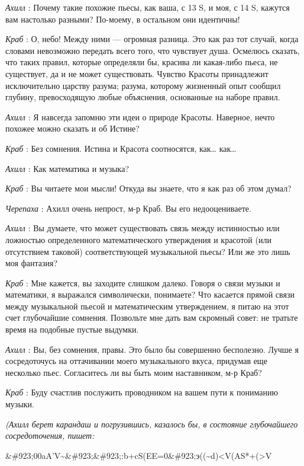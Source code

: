 \emph{Ахилл} : Почему такие похожие пьесы, как ваша, с 13 S, и моя, с 14 S, кажутся вам настолько разными? По-моему, в остальном они идентичны!

\emph{Краб} : О, небо! Между ними --- огромная разница. Это как раз тот случай, когда словами невозможно передать всего того, что чувствует душа. Осмелюсь сказать, что таких правил, которые определяли бы, красива ли какая-либо пьеса, не существует, да и не может существовать. Чувство Красоты принадлежит исключительно царству разума; разума, которому жизненный опыт сообщил глубину, превосходящую любые объяснения, основанные на наборе правил.

\emph{Ахилл} : Я навсегда запомню эти идеи о природе Красоты. Наверное, нечто похожее можно сказать и об Истине?

\emph{Краб} : Без сомнения. Истина и Красота соотносятся, как\ldots{} как\ldots{}

\emph{Ахилл} : Как математика и музыка?

\emph{Краб} : Вы читаете мои мысли! Откуда вы знаете, что я как раз об этом думал?

\emph{Черепаха} : Ахилл очень непрост, м-р Краб. Вы его недооцениваете.

\emph{Ахилл} : Вы думаете, что может существовать связь между истинностью или ложностью определенного математического утверждения и красотой (или отсутствием таковой) соответствующей музыкальной пьесы? Или же это лишь моя фантазия?

\emph{Краб} : Мне кажется, вы заходите слишком далеко. Говоря о связи музыки и математики, я выражался символически, понимаете? Что касается прямой связи между музыкальной пьесой и математическим утверждением, я питаю на этот счет глубочайшие сомнения. Позвольте мне дать вам скромный совет: не тратьте время на подобные пустые выдумки.

\emph{Ахилл} : Вы, без сомнения, правы. Это было бы совершенно бесполезно. Лучше я сосредоточусь на оттачивании моего музыкального вкуса, придумав еще несколько пьес. Согласитесь ли вы быть моим наставником, м-р Краб?

\emph{Краб} : Буду счастлив послужить проводником на вашем пути к пониманию музыки.

\emph{(Ахилл берет карандаш и погрузившись, казалось бы, в состояние глубочайшего сосредоточения, пишет:}

\&\#923;00aA'V\textasciitilde\&\#923;\&\#923;:b+cS(EE=0\&\#923;э((\textasciitilde d)\textless V(AS*+(\textgreater V

